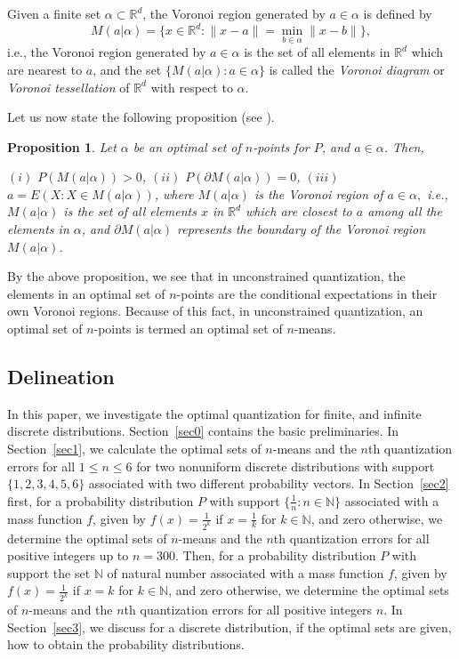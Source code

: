 \documentclass[12pt, reqno]{amsart}
\theoremstyle{plain}
\newtheorem{prop}[subsection]{Proposition}
\theoremstyle{definition}
\newcommand{\sci}{\subset}%
\newcommand{\set}[1]{\{#1\}}%
\newcommand{\ga}{\alpha}
\newcommand{\tit}{\textit}%
\newcommand{\D}[1]{\mathbb{#1}}%
\begin{document}
Given a finite set $\ga\sci \D R^d$, the Voronoi region generated by $a\in \ga$ is defined by
\[M(a|\ga)=\set{x \in \D R^d : \|x-a\|=\min_{b \in \ga}\|x-b\|},\]
i.e., the Voronoi region generated by $a\in \ga$ is the set of all elements in $\D R^d$ which are nearest to $a$, and the set $\set{M(a|\ga) : a \in \ga}$ is called the \tit{Voronoi diagram} or \tit{Voronoi tessellation} of $\D R^d$ with respect to $\ga$.

Let us now state the following proposition (see \cite{ GG, GL2}).
\begin{prop} \label{prop0}
Let $\ga$ be an optimal set of $n$-points for $P$, and $a\in \ga$. Then,

$(i)$ $P(M(a|\ga))>0$, $(ii)$ $ P(\partial M(a|\ga))=0$, $(iii)$ $a=E(X : X \in M(a|\ga))$,
where $M(a|\ga)$ is the Voronoi region of $a\in \ga, $ i.e.,  $M(a|\ga)$ is the set of all elements $x$ in $\D R^d$ which are closest to $a$ among all the elements in $\ga$, and $\partial M(a|\ga)$ represents the boundary of the Voronoi region $M(a|\ga)$.
\end{prop}
By the above proposition, we see that in unconstrained quantization, the elements in an optimal set of $n$-points are the conditional expectations in their own Voronoi regions. Because of this fact, in unconstrained quantization, an optimal set of $n$-points is termed an optimal set of 
$n$-means.
 
\subsection{Delineation} In this paper, we investigate the optimal quantization for finite, and infinite discrete distributions. Section~\ref{sec0} contains the basic preliminaries. In Section~\ref{sec1}, we calculate the optimal sets of $n$-means and the $n$th quantization errors for all $1\leq n\leq 6$ for two nonuniform discrete distributions with support $\set{1, 2, 3, 4, 5, 6}$ associated with two different probability vectors. In Section~\ref{sec2} first, for a probability distribution $P$ with support $\set{\frac 1n : n\in \D N}$ associated with a mass function $f$, given by $f(x)=\frac 1 {2^k}$ if $x=\frac 1 k$ for $k\in \D N$, and zero otherwise, we determine the optimal sets of $n$-means and the $n$th quantization errors for all positive integers up to $n=300$. Then, for a probability distribution $P$ with support the set $\D N$ of natural number associated with a mass function $f$, given by $f(x)=\frac 1 {2^k}$ if $x=k$ for $k\in \D N$, and zero otherwise, we determine the optimal sets of $n$-means and the $n$th quantization errors for all positive integers $n$. In Section~\ref{sec3}, we discuss for a discrete distribution, if the optimal sets are given, how to obtain the probability distributions.
 
\end{document}
